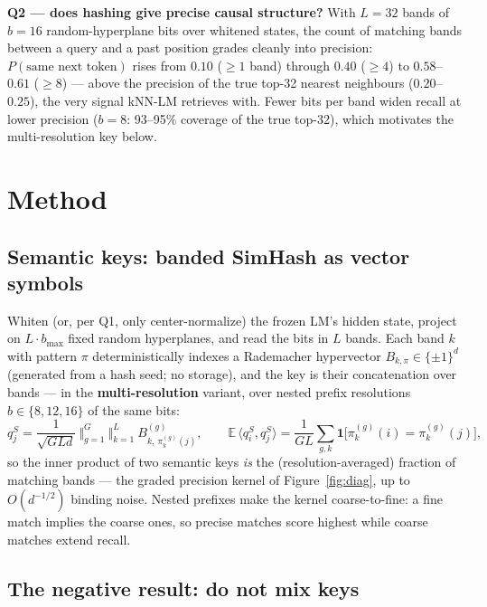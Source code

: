 \documentclass[11pt]{article}
\begin{document}
\textbf{Q2 --- does hashing give precise causal structure?} With $L = 32$ bands of $b = 16$ random-hyperplane bits \cite{charikar} over whitened states, the count of matching bands between a query and a past position grades cleanly into precision: $P(\text{same next token})$ rises from $0.10$ ($\ge 1$ band) through $0.40$ ($\ge 4$) to $0.58$--$0.61$ ($\ge 8$) --- above the precision of the true top-32 nearest neighbours ($0.20$--$0.25$), the very signal kNN-LM retrieves with. Fewer bits per band widen recall at lower precision ($b=8$: 93--95\% coverage of the true top-32), which motivates the multi-resolution key below.

\section{Method}

\subsection{Semantic keys: banded SimHash as vector symbols}

Whiten (or, per Q1, only center-normalize) the frozen LM's hidden state, project on $L \cdot b_{\max}$ fixed random hyperplanes, and read the bits in $L$ bands. Each band $k$ with pattern $\pi$ deterministically indexes a Rademacher hypervector $B_{k,\pi} \in \{\pm 1\}^{d}$ (generated from a hash seed; no storage), and the key is their concatenation over bands --- in the \textbf{multi-resolution} variant, over nested prefix resolutions $b \in \{8, 12, 16\}$ of the same bits:
\begin{equation}
q^S_j = \frac{1}{\sqrt{G L d}}\ \big\Vert_{g=1}^{G}\ \big\Vert_{k=1}^{L}\ B^{(g)}_{k,\ \pi^{(g)}_k(j)},
\qquad
\mathbb{E}\,\langle q^S_i, q^S_j\rangle = \frac{1}{G L}\sum_{g,k} \mathbf{1}\big[\pi^{(g)}_k(i) = \pi^{(g)}_k(j)\big],
\end{equation}
so the inner product of two semantic keys \emph{is} the (resolution-averaged) fraction of matching bands --- the graded precision kernel of Figure~\ref{fig:diag}, up to $O(d^{-1/2})$ binding noise. Nested prefixes make the kernel coarse-to-fine: a fine match implies the coarse ones, so precise matches score highest while coarse matches extend recall.

\subsection{The negative result: do not mix keys}\label{sec:hybrid}
\end{document}
